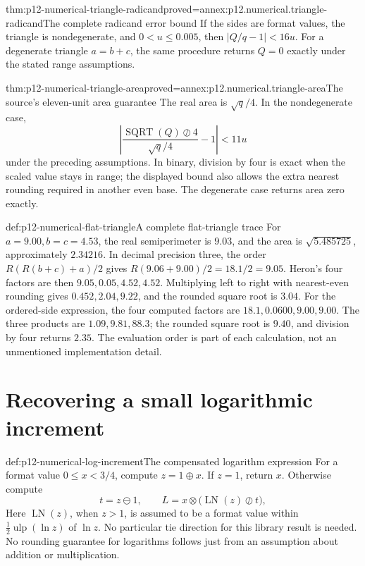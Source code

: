 \begin{hbtheorem}{thm:p12-numerical-triangle-radicand}{proved=annex:p12.numerical.triangle-radicand}{The complete radicand error bound}
If the sides are format values, the triangle is nondegenerate, and
\(0<u\leq0.005\), then \(|Q/q-1|<16u\).
For a degenerate triangle \(a=b+c\), the same procedure returns
\(Q=0\) exactly under the stated range assumptions.
\end{hbtheorem}

\begin{hbtheorem}{thm:p12-numerical-triangle-area}{proved=annex:p12.numerical.triangle-area}{The source's eleven-unit area guarantee}
The real area is \(\sqrt q/4\). In the nondegenerate case,
\[
 \left|\frac{\operatorname{SQRT}(Q)\oslash4}{\sqrt q/4}-1\right|
 <11u
\]
under the preceding assumptions. In binary, division by four is exact
when the scaled value stays in range; the displayed bound also allows
the extra nearest rounding required in another even base.
The degenerate case returns area zero exactly.
\end{hbtheorem}

\begin{hbexample}{def:p12-numerical-flat-triangle}{A complete flat-triangle trace}
For \(a=9.00,b=c=4.53\), the real semiperimeter is \(9.03\),
and the area is \(\sqrt{5.485725}\), approximately \(2.34216\).
In decimal precision three, the order
\(R(R(b+c)+a)/2\) gives \(R(9.06+9.00)/2=18.1/2=9.05\).
Heron's four factors are then \(9.05,0.05,4.52,4.52\).
Multiplying left to right with nearest-even rounding gives
\(0.452,2.04,9.22\), and the rounded square root is \(3.04\).
For the ordered-side expression, the four computed factors are
\(18.1,0.0600,9.00,9.00\). The three products are
\(1.09,9.81,88.3\); the rounded square root is \(9.40\), and
division by four returns \(2.35\). The evaluation order is part
of each calculation, not an unmentioned implementation detail.
\end{hbexample}

\section{Recovering a small logarithmic increment}

\begin{hbdefinition}{def:p12-numerical-log-increment}{The compensated logarithm expression}
For a format value \(0\leq x<3/4\), compute \(z=1\oplus x\).
If \(z=1\), return \(x\). Otherwise compute
\[
 t=z\ominus1,\qquad
 L=x\otimes\bigl(\operatorname{LN}(z)\oslash t\bigr),
\]
Here \(\operatorname{LN}(z)\), when \(z>1\), is assumed to be a
format value within \(\tfrac12\operatorname{ulp}(\ln z)\) of
\(\ln z\). No particular tie direction for this library result is
needed. No rounding guarantee for logarithms follows
just from an assumption about addition or multiplication.
\end{hbdefinition}

